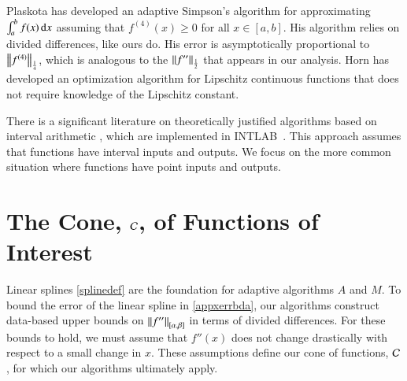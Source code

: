 \documentclass[review]{elsarticle}
\theoremstyle{definition}
\begin{document}
Plaskota \cite{Pla15a} has developed an adaptive Simpson's algorithm for
approximating $\int_a^b f(x) \, \dif x$ assuming that $f^{(4)}(x) \ge 0$ for all
$x \in [a,b]$. His algorithm relies on divided differences, like ours do. His
error is asymptotically proportional to $\norm[\frac14]{f^{(4)}}$, which is
analogous to the $\norm[\frac12]{f''}$ that appears in our analysis.  Horn \cite{Hor06a}
has developed an optimization algorithm for Lipschitz continuous functions that does not
require knowledge of the Lipschitz constant.

There is a significant literature on theoretically justified algorithms based on
interval arithmetic \cite{MoKeCl09, Rum10a}, which are implemented in
INTLAB~\cite{Rum99a}. This approach assumes that functions have interval inputs
and outputs. We focus on the more common situation where functions have point
inputs and outputs.

\section{The Cone, $\cc$, of Functions of Interest} \label{sec:cone}

Linear splines \eqref{splinedef} are the foundation for adaptive algorithms $A$
and $M$. To bound the error of the linear spline in \eqref{appxerrbda}, our
algorithms construct data-based upper bounds on $\norm[{[\alpha, \beta]}]{f''}$
in terms of divided differences. For these bounds to hold, we must assume that
$f''(x)$ does not change drastically with respect to a small change in $x$.
These assumptions define our cone of functions, $\cc$, for which our algorithms
ultimately apply.
\end{document}
